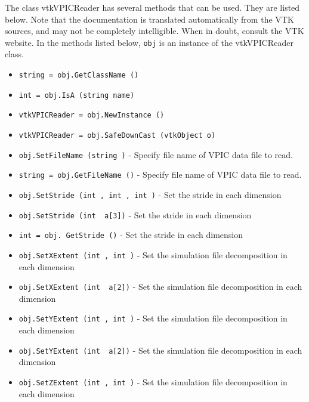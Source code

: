 The class vtkVPICReader has several methods that can be used.
  They are listed below.
Note that the documentation is translated automatically from the VTK sources,
and may not be completely intelligible.  When in doubt, consult the VTK website.
In the methods listed below, \verb|obj| is an instance of the vtkVPICReader class.
\begin{itemize}
\item  \verb|string = obj.GetClassName ()|

\item  \verb|int = obj.IsA (string name)|

\item  \verb|vtkVPICReader = obj.NewInstance ()|

\item  \verb|vtkVPICReader = obj.SafeDownCast (vtkObject o)|

\item  \verb|obj.SetFileName (string )| -  Specify file name of VPIC data file to read.

\item  \verb|string = obj.GetFileName ()| -  Specify file name of VPIC data file to read.

\item  \verb|obj.SetStride (int , int , int )| -  Set the stride in each dimension

\item  \verb|obj.SetStride (int  a[3])| -  Set the stride in each dimension

\item  \verb|int = obj. GetStride ()| -  Set the stride in each dimension

\item  \verb|obj.SetXExtent (int , int )| -  Set the simulation file decomposition in each dimension

\item  \verb|obj.SetXExtent (int  a[2])| -  Set the simulation file decomposition in each dimension

\item  \verb|obj.SetYExtent (int , int )| -  Set the simulation file decomposition in each dimension

\item  \verb|obj.SetYExtent (int  a[2])| -  Set the simulation file decomposition in each dimension

\item  \verb|obj.SetZExtent (int , int )| -  Set the simulation file decomposition in each dimension


\end{itemize}
